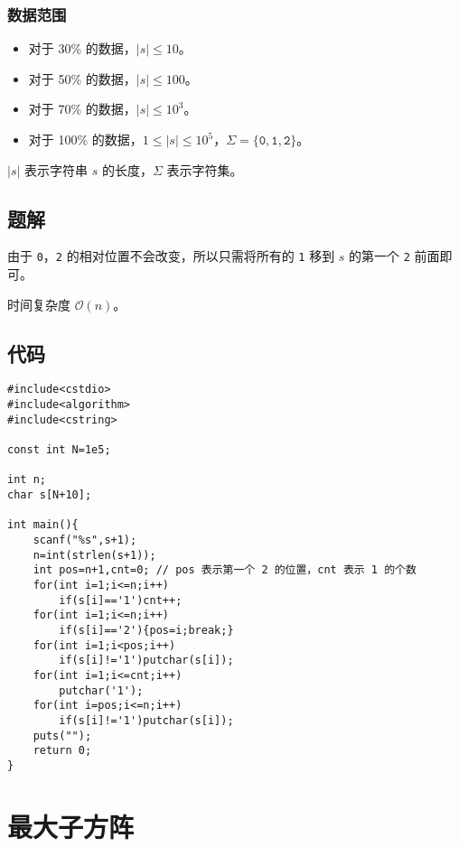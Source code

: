\documentclass{article}
\begin{document}
	\subsubsection{数据范围}

	\begin{itemize}
		\item 对于 30\% 的数据，$|s|\le 10$。
		\item 对于 50\% 的数据，$|s|\le 100$。
		\item 对于 70\% 的数据，$|s|\le 10^{3}$。
		\item 对于 100\% 的数据，$1\le |s|\le 10^{5}$，$\Sigma=\{\texttt{0},\texttt{1},\texttt{2}\}$。
	\end{itemize}

	$|s|$ 表示字符串 $s$ 的长度，$\Sigma$ 表示字符集。

	\newpage

	\subsection{题解}

	由于 \texttt{0}，\texttt{2} 的相对位置不会改变，所以只需将所有的 \texttt{1} 移到 $s$ 的第一个 \texttt{2} 前面即可。

	时间复杂度 $\mathcal O(n)$。

	\subsection{代码}

	\begin{lstlisting}
#include<cstdio>
#include<algorithm>
#include<cstring>

const int N=1e5;

int n;
char s[N+10];

int main(){
	scanf("%s",s+1);
	n=int(strlen(s+1));
	int pos=n+1,cnt=0; // pos 表示第一个 2 的位置，cnt 表示 1 的个数
	for(int i=1;i<=n;i++)
		if(s[i]=='1')cnt++;
	for(int i=1;i<=n;i++)
		if(s[i]=='2'){pos=i;break;}
	for(int i=1;i<pos;i++)
		if(s[i]!='1')putchar(s[i]);
	for(int i=1;i<=cnt;i++)
		putchar('1');
	for(int i=pos;i<=n;i++)
		if(s[i]!='1')putchar(s[i]);
	puts("");
	return 0;
}
	\end{lstlisting}

	\newpage

	\section{最大子方阵}
\end{document}
